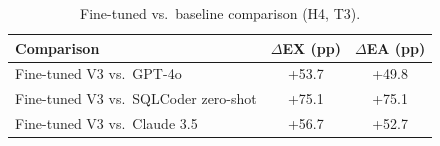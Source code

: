 \begin{table}[t]
  \centering
  \caption{Fine-tuned vs.\ baseline comparison (H4, T3).}
  \label{tab:t3}
  \small
  \begin{tabular}{lcc}
    \toprule
    Comparison & $\Delta$EX (pp) & $\Delta$EA (pp) \\
    \midrule
    Fine-tuned V3 vs.\ GPT-4o & +53.7 & +49.8 \\
    Fine-tuned V3 vs.\ SQLCoder zero-shot & +75.1 & +75.1 \\
    Fine-tuned V3 vs.\ Claude 3.5 & +56.7 & +52.7 \\
    \bottomrule
  \end{tabular}
\end{table}
